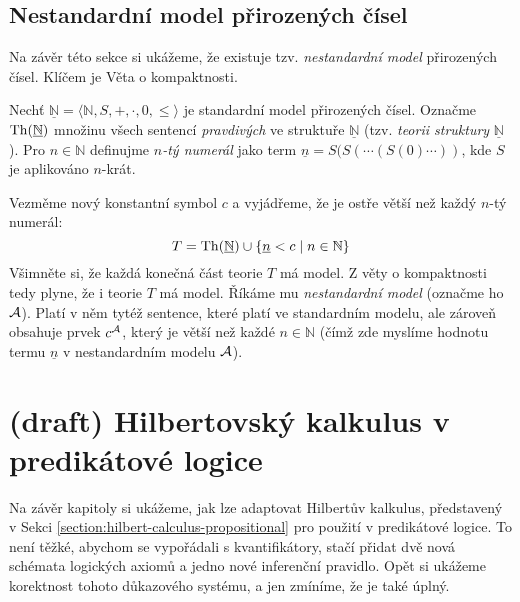 \subsection{Nestandardní model přirozených čísel}

Na závěr této sekce si ukážeme, že existuje tzv. \emph{nestandardní model} přirozených čísel. Klíčem je Věta o kompaktnosti.
    
Nechť $\underline{\mathbb N}=\langle\mathbb N,S,+,\cdot,0,\leq\rangle$ je standardní model přirozených čísel. Označme $\operatorname{Th}(\underline{\mathbb N})$ množinu všech sentencí \emph{pravdivých} ve struktuře $\underline{\mathbb N}$ (tzv. \emph{teorii struktury} $\underline{\mathbb N}$). Pro $n\in \mathbb N$ definujme \emph{$n$-tý numerál} jako term $\underline n=S(S(\cdots (S(0)\cdots))$, kde $S$ je aplikováno $n$-krát.

Vezměme nový konstantní symbol $c$ a vyjádřeme, že je ostře větší než každý $n$-tý numerál:
$$
T=\operatorname{Th}(\underline{\mathbb N})\cup\{\underline n<c\mid n\in \mathbb N\}
$$
Všimněte si, že každá konečná část teorie $T$ má model. Z věty o kompaktnosti tedy plyne, že i teorie $T$ má model. Říkáme mu \emph{nestandardní model} (označme ho $\mathcal{A}$). Platí v něm tytéž sentence, které platí ve standardním modelu, ale zároveň obsahuje prvek $c^{\mathcal{A}}$, který je větší než každé $n\in \mathbb N$ (čímž zde myslíme hodnotu termu $\underline n$ v nestandardním modelu $\mathcal{A}$).
    

\section{(draft) Hilbertovský kalkulus v predikátové logice}
\todo

Na závěr kapitoly si ukážeme, jak lze adaptovat Hilbertův kalkulus, představený v Sekci \ref{section:hilbert-calculus-propositional} pro použití v predikátové logice. To není těžké, abychom se vypořádali s kvantifikátory, stačí přidat dvě nová schémata logických axiomů a jedno nové inferenční pravidlo. Opět si ukážeme korektnost tohoto důkazového systému, a jen zmíníme, že je také úplný.

